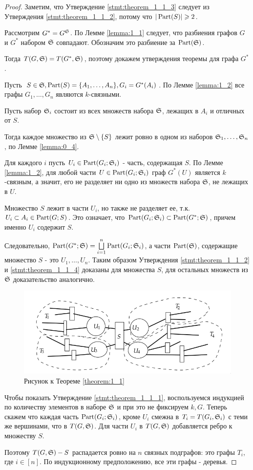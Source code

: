 \documentclass[../main.tex]{subfiles}
\begin{document}
\begin{proof}
	Заметим, что Утверждение \eqref{stmt:theorem_1_1_3} следует из Утверждения \eqref{stmt:theorem_1_1_2}, потому что $|\Part(S)| \geqslant 2$.

	Рассмотрим  $G^* = G^\S$.
	По Лемме \ref{lemma:1_1} следует, что разбиения графов  $G$ и  $G^*$ набором  $\S$ совпадают. Обозначим это разбиение за  $\Part(\S)$.

	Тогда  $T(G, \S) = T(G^*, \S)$, поэтому докажем утверждения теоремы для графа  $G^*$.

	Пусть $S \in \S, \Part(S) = \{A_1, \ldots, A_n\}, G_i = G^*(A_i)$.
	По Лемме \ref{lemma:1_2} все графы $G_1, \ldots, G_n$ являются  $k$-связными.

	Пусть набор  $\S_i$ состоит из всех множеств набора  $\S$, лежащих в  $A_i$ и отличных от  $S$.

	Тогда каждое множество из  $\S \setminus \{S\}$ лежит ровно в одном из наборов $\S_1, \ldots, \S_n$, по Лемме \ref{lemma:0_4}.

	Для каждого $i$ пусть $U_i \in \Part(G_i;\S_i)$ - часть, содержащая  $S$.
	По Лемме \ref{lemma:1_2}, для любой части $U \in \Part(G_i;\S_i)$ граф $G^*(U)$ является  $k$-связным, а значит, его не разделяет ни одно из множеств набора  $\S$, не лежащих в  $U$. 

	Множество $S$ лежит в части  $U_i$, но также не разделяет ее, т.к. $U_i \subset A_i \in \Part(G;S)$.
	Это означает, что  $\Part(G_i;\S_i) \subset \Part(G^*; \S)$, причем именно  $U_i$ содержит  $S$.

	Следовательно, $\Part(G^*; \S) = \bigsqcup\limits_{i=1}^n \Part(G_i;\S_i)$, а части  $\Part(\S)$, содержащие множество  $S$ - это  $U_1, \ldots, U_n$.
	Таким образом Утверждения \eqref{stmt:theorem_1_1_2} и \eqref{stmt:theorem_1_1_4} доказаны для множества  $S$, для остальных множеств из  $\S$ доказательство аналогично.

\begin{figure}[ht]
    \centering
	\includegraphics[width=0.5\columnwidth]{figures/theorem_1_1.png}
    \caption{Рисунок к Теореме \ref{theorem:1_1}}
    \label{fig:theorem_1_1}
\end{figure}

	Чтобы показать Утверждение \eqref{stmt:theorem_1_1_1}, воспользуемся индукцией по количеству элементов в наборе $\S$ и при это не фиксируем  $k, G$.
	Теперь скажем что каждая часть $\Part(G_i; \S_i)$, кроме  $U_i$ смежна в  $T_i = T(G_i, \S_i)$ с теми же вершинами, что в  $T(G, \S)$.
	Для части  $U_i$ в  $T(G, \S)$ добавляется ребро к множеству  $S$.

	Поэтому  $T(G, \S) - S$ распадается ровно на  $n$ связных подграфов: это графы  $T_i$, где  $i \in [n]$.
	По индукционному предположению, все эти графы - деревья.

\end{proof}
\end{document}
